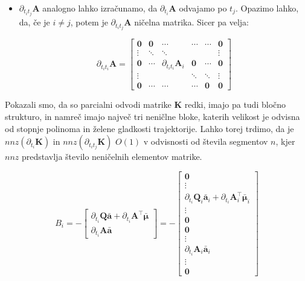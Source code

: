 \documentclass[mat2, tisk]{fmfdelo}
\newcommand{\aimplicit}{\bar{\mathbf{a}}}
\newcommand{\muimplicit}{\bar{\mathbf{\mu}}}
\newcommand{\qmat}{\mathbf{Q}}
\newcommand{\amat}{\mathbf{A}}
\newcommand{\kmat}{\mathbf{K}}
\begin{document}
\begin{itemize}
\item $\partial_{t_it_j}\amat$ analogno lahko izračunamo, da $\partial_{t_i} \amat$ odvajamo po $t_j$. Opazimo lahko, da, če je $i \neq j$, potem je $\partial_{t_it_j}\amat$ ničelna matrika. Sicer pa velja:

\begin{equation}
    \partial_{t_it_i} \amat =
    \begin{bmatrix}
    \mathbf{0} & \mathbf{0} & \cdots & \cdots & \cdots & \mathbf{0} \\
    \vdots & \ddots & \ddots & & & \vdots \\
    \mathbf{0} & \cdots & \partial_{t_it_i} \amat_i & \mathbf{0} & \cdots & \mathbf{0} \\
    \vdots & & & \ddots & \ddots & \vdots \\
    \mathbf{0} & \cdots & \cdots & \cdots & \mathbf{0} & \mathbf{0}
    \end{bmatrix}
\end{equation}
\end{itemize}

Pokazali smo, da so parcialni odvodi matrike $\kmat$ redki, imajo pa tudi bločno strukturo, in namreč imajo največ tri neničlne bloke, katerih velikost je odvisna od stopnje polinoma in želene gladkosti trajektorije. Lahko torej trdimo, da je $nnz(\partial_{t_i}\kmat)$ in $nnz(\partial_{t_it_j}\kmat)$ $O(1)$ v odvisnosti od števila segmentov $n$, kjer $nnz$ predstavlja število neničelnih elementov matrike.

\begin{equation}
    B_i = - \begin{bmatrix}
        \partial_{t_i}\qmat \aimplicit + \partial_{t_i} \amat^{\top} \muimplicit \\
        \partial_{t_i} \amat \aimplicit
    \end{bmatrix} = - \begin{bmatrix}
        \mathbf{0} \\
        \vdots \\
        \partial_{t_i} \qmat_i \aimplicit_i + \partial_{t_i} \amat_i^{\top} \muimplicit_i \\
        \vdots \\
        \mathbf{0} \\
        \mathbf{0} \\
        \vdots \\
        \partial_{t_i} \amat_i \aimplicit_i \\
        \vdots \\
        \mathbf{0}
    \end{bmatrix}
\end{equation}
\end{document}
